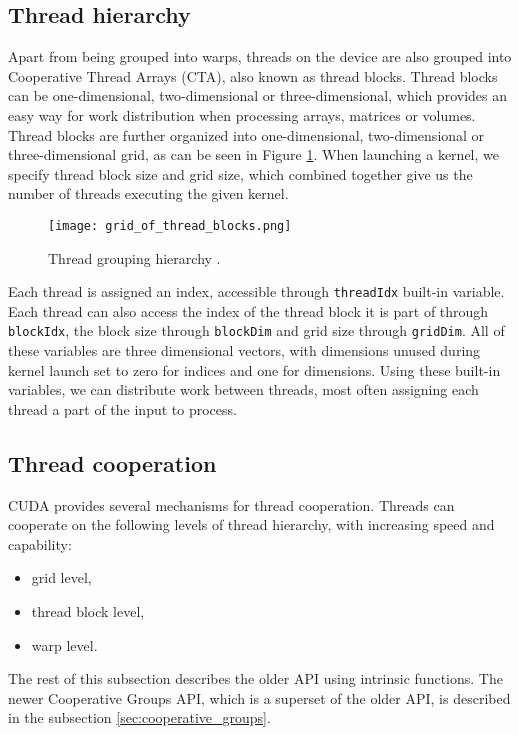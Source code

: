 \subsection{Thread hierarchy}

Apart from being grouped into warps, threads on the device are also grouped into Cooperative Thread Arrays (CTA), also known as thread blocks. Thread blocks can be one-dimensional, two-dimensional or three-dimensional, which provides an easy way for work distribution when processing arrays, matrices or volumes. Thread blocks are further organized into one-dimensional, two-dimensional or three-dimensional grid, as can be seen in Figure \ref{fig:thread_hierarchy}. When launching a kernel, we specify thread block size and grid size, which combined together give us the number of threads executing the given kernel.

\begin{figure}[h]
	\centering
	\texttt{[image: grid\_of\_thread\_blocks.png]}
	\caption{Thread grouping hierarchy \citep{site:cuda}.}
	\label{fig:thread_hierarchy}
\end{figure}

Each thread is assigned an index, accessible through \texttt{threadIdx} built-in variable. Each thread can also access the index of the thread block it is part of through \texttt{blockIdx}, the block size through \texttt{blockDim} and grid size through \texttt{gridDim}. All of these variables are three dimensional vectors, with dimensions unused during kernel launch set to zero for indices and one for dimensions. Using these built-in variables, we can distribute work between threads, most often assigning each thread a part of the input to process.

\subsection{Thread cooperation}
\label{sec:thread_cooperation}
CUDA provides several mechanisms for thread cooperation. Threads can cooperate on the following levels of thread hierarchy, with increasing speed and capability:

\begin{itemize}
	\item grid level,
	\item thread block level,
	\item warp level.
\end{itemize}

The rest of this subsection describes the older API using intrinsic functions. The newer Cooperative Groups API, which is a superset of the older API, is described in the subsection \ref{sec:cooperative_groups}.

